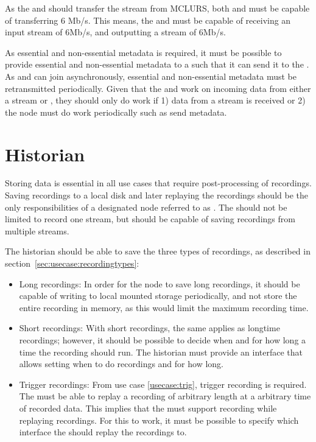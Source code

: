 As the \pubs{} and \subs{} should transfer the stream from MCLURS, both \pubs{} and \subs{} must be capable of transferring 6 Mb/s. This means, the \pubs{} and \subs{} must be capable of receiving an input stream of 6Mb/s, and outputting a stream of 6Mb/s.



As essential and non-essential metadata is required, it must be possible to provide essential and non-essential metadata to a  such that it can send it to the . As  and  can join asynchronously, essential and non-essential metadata must be retransmitted periodically. 
Given that the  and  work on incoming data from either a stream or , they should only do work if 1) data from a stream is received or 2) the node must do work periodically such as send metadata.

\section{Historian} \label{sec:analysis:historian}

Storing data is essential in all use cases that require post-processing of recordings. Saving recordings to a local disk and later replaying the recordings should be the only responsibilities of a designated node referred to as .
The  should not be limited to record one stream, but should be capable of saving recordings from multiple streams. 

The historian should be able to save the  three types of recordings, as described in section~\ref{sec:usecase:recordingtypes}:
\begin{itemize}
	\item Long recordings:
		In order for the node to save long recordings, it should be capable of writing to local mounted storage periodically, and not store the entire recording in memory, as this would limit the maximum recording time.

	\item Short recordings:
		With short recordings, the same applies as longtime recordings; however, it should be possible to decide when and for how long a time the recording should run. The historian must provide an interface that allows setting when to do recordings and for how long.
		
	\item Trigger recordings:
		From use case \ref{usecase:trig}, trigger recording is required. The  must be able to replay a recording of arbitrary length at a arbitrary time of recorded data. This implies that the  must support recording while replaying recordings. For this to work, it must be possible to specify which interface the  should replay the recordings to.
\end{itemize}

